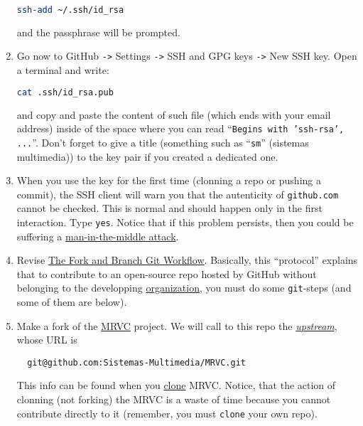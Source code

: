 \begin{enumerate}
  \begin{lstlisting}[language=bash]  
    ssh-add ~/.ssh/id_rsa
  \end{lstlisting}

  and the passphrase will be prompted.
  
\item Go now to GitHub \texttt{->} Settings \texttt{->} SSH and GPG
  keys \texttt{->} New SSH key. Open a terminal and write:
  
  \begin{lstlisting}[language=bash]  
    cat .ssh/id_rsa.pub
  \end{lstlisting}

  and copy and paste the content of such file (which ends with your
  email address) inside of the space where you can read
  ``\texttt{Begins with 'ssh-rsa', ...}''. Don't forget to give a
  title (something such as ``\texttt{sm}'' (sistemas multimedia))
  to the key pair if you created a dedicated one.
  
\item When you use the key for the first time (clonning a repo or
  pushing a commit), the SSH client will warn you that the autenticity
  of \texttt{github.com} cannot be checked. This is normal and should
  happen only in the first interaction. Type \texttt{yes}. Notice that
  if this problem persists, then you could be suffering a
  \href{https://en.wikipedia.org/wiki/Man-in-the-middle_attack}{man-in-the-middle
    attack}.

\item Revise
  \href{https://github.com/vicente-gonzalez-ruiz/fork_and_branch_git_workflow}{The
    Fork and Branch Git Workflow}. Basically, this ``protocol''
  explains that to contribute to an open-source repo hosted by GitHub
  without belonging to the developping
  \href{https://docs.github.com/en/organizations/collaborating-with-groups-in-organizations/about-organizations}{organization},
  you must do some \texttt{git}-steps (and some of them are below).

\item Make a fork of the
  \href{https://github.com/Sistemas-Multimedia/MRVC}{MRVC}
  project. We will call to this repo the
  \href{https://docs.github.com/en/github/getting-started-with-github/github-glossary#upstream}{\emph{upstream}}, whose URL is
\begin{verbatim}
  git@github.com:Sistemas-Multimedia/MRVC.git
\end{verbatim}        
  This info can be found when you
  \href{https://docs.github.com/en/github/creating-cloning-and-archiving-repositories/cloning-a-repository}{clone}
  MRVC. Notice, that the action of clonning (not forking) the MRVC is a waste of
  time because you cannot contribute directly to it (remember, you
  must \texttt{clone} your own repo).


\end{enumerate}
